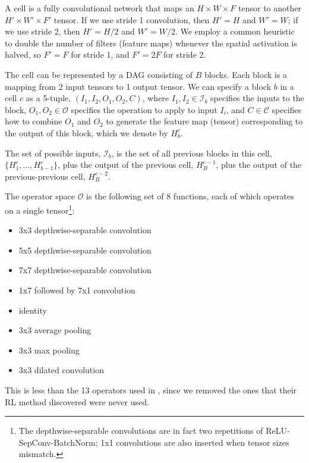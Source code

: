 \documentclass[runningheads]{llncs}
\begin{document}
A cell is a fully convolutional network
that maps an $H \times W \times F$ tensor
to another $H' \times W' \times F'$ tensor.
If we use stride 1 convolution, then $H'=H$ and $W'=W$;
if we use stride 2, then $H'=H/2$ and $W'=W/2$.
We employ a common heuristic to double the number of filters (feature maps)
whenever the spatial activation is halved,
so $F'=F$ for stride 1, and $F'=2F$ for stride 2.

The cell can be represented 
by a DAG consisting of $B$ blocks. Each block is a mapping from 2 input
tensors to 1 output tensor.
We can specify a block $b$ in a cell $c$ as a 5-tuple,
$(I_1, I_2, O_1, O_2, C)$,
where
$I_1, I_2 \in \mathcal{I}_b$ specifies the 
inputs to the block,
$O_1, O_2 \in \mathcal{O}$ specifies the operation to apply to input $I_i$,
and $C \in \mathcal{C}$ specifies how to combine $O_1$ and $O_2$ to generate the feature map (tensor) corresponding to  the output of this block,
which we denote by $H_b^c$.

The set of possible inputs,
 $\mathcal{I}_b$, is the
set of all previous blocks in this cell,
$\{H_1^c,\ldots,H^c_{b-1}\}$,
plus the output of the previous cell,
$H_B^{c-1}$,
plus the output of the previous-previous cell,
$H_B^{c-2}$.

The operator space  $\mathcal{O}$
is the following set of 8 functions, each of which
operates on a single tensor\footnote{The depthwise-separable convolutions are in fact two repetitions of ReLU-SepConv-BatchNorm; 1x1 convolutions are also inserted when tensor sizes mismatch.}:

\begin{minipage}{0.5\textwidth}
\renewcommand\labelitemi{$\bullet$}
\footnotesize
\bigbreak
\begin{itemize}
\item 3x3 depthwise-separable convolution
\item 5x5 depthwise-separable convolution
\item 7x7 depthwise-separable convolution
\item 1x7 followed by 7x1 convolution
\end{itemize}
\bigbreak
\end{minipage}\begin{minipage}{0.5\textwidth}
\renewcommand\labelitemi{$\bullet$}
\footnotesize
\bigbreak
\begin{itemize}
\item identity
\item 3x3 average pooling
\item 3x3 max pooling
\item 3x3 dilated convolution
\end{itemize}
\bigbreak
\end{minipage}%
This is less than the 13 operators used in \cite{DBLP:journals/corr/ZophVSL17},
since 
we removed the ones that their RL method discovered were never used.
 
\end{document}

